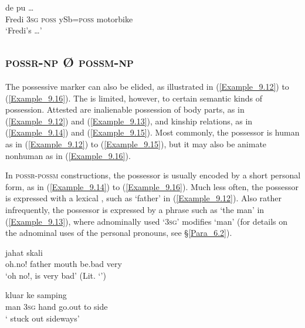 \ea
\label{Example_9.11}
 {de} {pu} {} {} {\ldots}\\ %
 Fredi  \textsc{3sg}  \textsc{poss}  ySb\textsc{=poss}  motorbike  \\
\glt
‘Fredi’s  {\ldots}’ \textstyleExampleSource{[081002-001-CvNP.0058]}
\z


\subsection{\textsc{possr-np} Ø \textsc{possm-np}}
\label{Para_9.1.3}
The possessive marker can also be elided, as illustrated in (\ref{Example_9.12}) to (\ref{Example_9.16}). The  is limited, however, to certain semantic kinds of possession. Attested are inalienable possession of body parts, as in (\ref{Example_9.12}) and (\ref{Example_9.13}), and kinship relations, as in (\ref{Example_9.14}) and (\ref{Example_9.15}). Most commonly, the possessor is human as in (\ref{Example_9.12}) to (\ref{Example_9.15}), but it may also be animate nonhuman as in (\ref{Example_9.16}).



In \textsc{possr-possm} constructions, the possessor is usually encoded by a short personal  form, as in (\ref{Example_9.14}) to (\ref{Example_9.16}). Much less often, the possessor is expressed with a lexical , such as  ‘father’ in (\ref{Example_9.12}). Also rather infrequently, the possessor is expressed by a  phrase such as  ‘the man’ in (\ref{Example_9.13}), where adnominally used  ‘\textsc{3sg}’ modifies  ‘man’ (for details on the adnominal uses of the personal pronouns, see §\ref{Para_6.2}).


\ea
\label{Example_9.12}
 {} {} {} {jahat} {skali}\\ %
 oh.no!  father { }    mouth  be.bad  very\\
\glt 
‘oh no!,  is very bad’ (Lit. ‘’) \textstyleExampleSource{[080923-008-Cv.0019]}
\z

\ea
\label{Example_9.13}
 {} {} {} {kluar} {ke} {samping}\\ %
 man  \textsc{3sg} { }    hand  go.out  to  side\\
 ‘ stuck out sideways’ \textstyleExampleSource{[081108-001-JR.0003]}
\z

